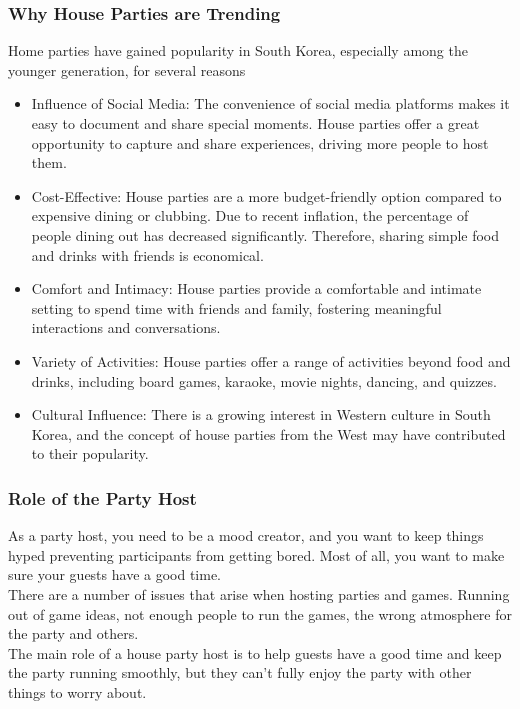 \documentclass[conference]{IEEEtran}
\begin{document}
        \subsubsection{Why House Parties are Trending}
        
        Home parties have gained popularity in South Korea, especially among the younger generation, for several reasons
        \begin{itemize}
            \item Influence of Social Media: The convenience of social media platforms makes it easy to document and share special moments. House parties offer a great opportunity to capture and share experiences, driving more people to host them.
            \item Cost-Effective: House parties are a more budget-friendly option compared to expensive dining or clubbing. Due to recent inflation, the percentage of people dining out has decreased significantly. Therefore, sharing simple food and drinks with friends is economical.
            \item Comfort and Intimacy: House parties provide a comfortable and intimate setting to spend time with friends and family, fostering meaningful interactions and conversations.
            \item Variety of Activities: House parties offer a range of activities beyond food and drinks, including board games, karaoke, movie nights, dancing, and quizzes.
            \item Cultural Influence: There is a growing interest in Western culture in South Korea, and the concept of house parties from the West may have contributed to their popularity.
        \end{itemize}
        
        \subsubsection{Role of the Party Host}
        As a party host, you need to be a mood creator, and you want to keep things hyped preventing participants from getting bored. Most of all, you want to make sure your guests have a good time.\\
		There are a number of issues that arise when hosting parties and games. Running out of game ideas, not enough people to run the games, the wrong  atmosphere for the party and others.\\
        The main role of a house party host is to help guests have a good time and keep the party running smoothly, but they can't fully enjoy the party with other things to worry about.
\end{document}
